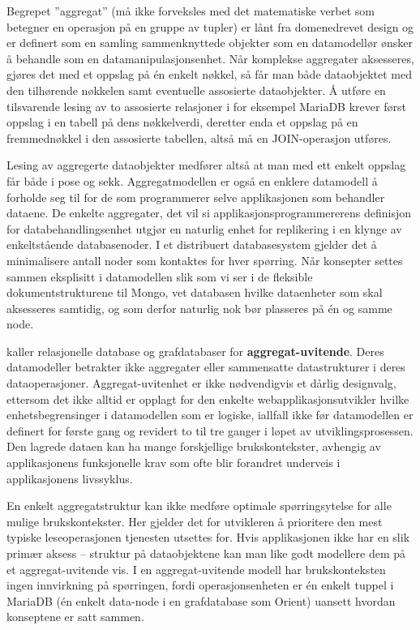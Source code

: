 Begrepet ''aggregat'' (må ikke forveksles med det matematiske verbet som betegner en operasjon på en gruppe av tupler) er lånt fra domenedrevet design og er definert som en samling sammenknyttede objekter som en datamodellør ønsker å behandle som en datamanipulasjonsenhet. Når komplekse aggregater aksesseres, gjøres det med et oppslag på én enkelt nøkkel, så får man både dataobjektet med den tilhørende nøkkelen samt eventuelle assosierte dataobjekter. Å utføre en tilsvarende lesing av to assosierte relasjoner i for eksempel MariaDB krever først oppslag i en tabell på dens nøkkelverdi, deretter enda et oppslag på en fremmednøkkel i den assosierte tabellen, altså må en JOIN-operasjon utføres.

Lesing av aggregerte dataobjekter medfører altså at man med ett enkelt oppslag får både i pose og sekk. Aggregatmodellen er også en enklere datamodell å forholde seg til for de som programmerer selve applikasjonen som behandler dataene. De enkelte aggregater, det vil si applikasjonsprogrammererens definisjon for databehandlingsenhet utgjør en naturlig enhet for replikering i en klynge av enkeltstående databasenoder. I et distribuert databasesystem gjelder det å minimalisere antall noder som kontaktes for hver spørring. Når konsepter settes sammen eksplisitt i datamodellen slik som vi ser i de fleksible dokumentstrukturene til Mongo, vet databasen hvilke dataenheter som skal aksesseres samtidig, og som derfor naturlig nok bør plasseres på én og samme node.

\cite{sadalage2013} kaller relasjonelle database og grafdatabaser for \textbf{aggregat-uvitende}. Deres datamodeller betrakter ikke aggregater eller sammensatte datastrukturer i deres dataoperasjoner. Aggregat-uvitenhet er ikke nødvendigvis et dårlig designvalg, ettersom det ikke alltid er opplagt for den enkelte webapplikasjonsutvikler hvilke enhetsbegrensinger i datamodellen som er logiske, iallfall ikke før datamodellen er definert for første gang og revidert to til tre ganger i løpet av utviklingsprosessen. Den lagrede dataen kan ha mange forskjellige brukskontekster, avhengig av applikasjonens funksjonelle krav som ofte blir forandret underveis i applikasjonens livssyklus.

En enkelt aggregatstruktur kan ikke medføre optimale spørringsytelse for alle mulige brukskontekster. Her gjelder det for utvikleren å prioritere den mest typiske leseoperasjonen tjenesten utsettes for. Hvis applikasjonen ikke har en slik primær aksess – struktur på dataobjektene kan man like godt modellere dem på et aggregat-uvitende vis. I en aggregat-uvitende modell har brukskonteksten ingen innvirkning på spørringen, fordi operasjonsenheten er én enkelt tuppel i MariaDB (én enkelt data-node i en grafdatabase som Orient) uansett hvordan konseptene er satt sammen.

